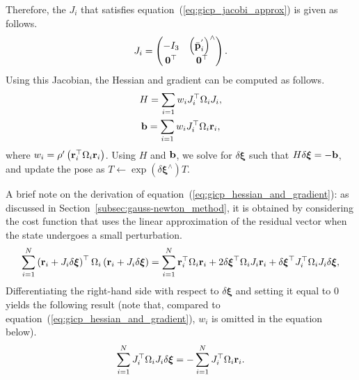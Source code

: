 Therefore, the $J_{i}$ that satisfies equation~(\ref{eq:gicp_jacobi_approx}) is given as follows.
%
\begin{align}
  J_{i} = \left( \begin{matrix}
            -I_{3}         & \left( \bar{ {\bf p} }_{i}^{'} \right)^{\wedge} \\
            {\bf 0}^{\top} & {\bf 0}^{\top}
          \end{matrix} \right).
  \label{eq:gicp_jacobian}
\end{align}
%
Using this Jacobian, the Hessian and gradient can be computed as follows.
%
\begin{align}
  \begin{gathered}
    H = \sum_{i=1} w_{i} J_{i}^{\top} \Omega_{i} J_{i}, \\
    {\bf b} = \sum_{i=1} w_{i} J_{i}^{\top} \Omega_{i} {\bf r}_{i}, \\
  \end{gathered}
  \label{eq:gicp_hessian_and_gradient}
\end{align}
%
where $w_{i} = \rho^{\prime} \left( {\bf r}_{i}^{\top} \Omega_{i} {\bf r}_{i} \right)$.
Using $H$ and ${\bf b}$, we solve for $\delta \boldsymbol \xi$ such that $H \delta \boldsymbol \xi = -{\bf b}$, and update the pose as $T \leftarrow \exp \left( \delta \boldsymbol \xi^{\wedge} \right) T$.

A brief note on the derivation of equation~(\ref{eq:gicp_hessian_and_gradient}): as discussed in Section~\ref{subsec:gauss-newton_method}, it is obtained by considering the cost function that uses the linear approximation of the residual vector when the state undergoes a small perturbation.
%
\begin{align}
  \sum_{i=1}^{N} \left( {\bf r}_{i} + J_{i} \delta \boldsymbol \xi \right)^{\top} \Omega_{i} \left( {\bf r}_{i} + J_{i} \delta \boldsymbol \xi \right)
  =
  \sum_{i=1}^{N} {\bf r}_{i}^{\top} \Omega_{i} {\bf r}_{i} + 2 \delta \boldsymbol \xi^{\top} \Omega_{i} J_{i} {\bf r}_{i} + \delta \boldsymbol \xi^{\top} J_{i}^{\top} \Omega_{i} J_{i} \delta \boldsymbol \xi,
\end{align}
%
Differentiating the right-hand side with respect to $\delta \boldsymbol \xi$ and setting it equal to 0 yields the following result (note that, compared to equation~(\ref{eq:gicp_hessian_and_gradient}), $w_{i}$ is omitted in the equation below).
%
\begin{align}
  \sum_{i=1}^{N} J_{i}^{\top} \Omega_{i} J_{i} \delta \boldsymbol \xi = -\sum_{i=1}^{N}  J_{i}^{\top} \Omega_{i} {\bf r}_{i}.
\end{align}
%



